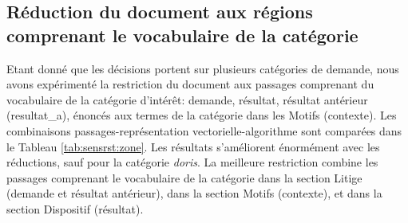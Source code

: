 \subsection{Réduction du document aux régions comprenant le vocabulaire de la catégorie}
Etant donné que les décisions portent sur plusieurs catégories de demande, nous avons expérimenté la restriction du document aux passages comprenant du vocabulaire de la catégorie d'intérêt: demande, résultat, résultat antérieur (resultat\_a), énoncés aux termes de la catégorie dans les Motifs (contexte). Les combinaisons passages-représentation vectorielle-algorithme sont comparées dans le Tableau \ref{tab:sensrst:zone}. Les résultats s'améliorent énormément avec les réductions, sauf pour la catégorie \textit{doris}. La meilleure restriction combine les passages comprenant le vocabulaire de la catégorie dans la section Litige (demande et résultat antérieur), dans la section Motifs (contexte), et dans la section Dispositif (résultat).
